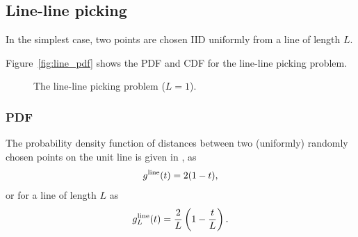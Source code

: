 \subsection{Line-line picking}
\label{sec:line_line}

In the simplest case, two points are chosen IID uniformly from a line
of length $L$. 

Figure~\ref{fig:line_pdf} shows the PDF and CDF for the line-line
picking problem.

\begin{figure}[tbp]
  \begin{center}
    \caption{The line-line picking problem ($L=1$).}
  \end{center}
\vspace{-4mm}
\end{figure}

\subsubsection{PDF}

The probability density function of distances between two (uniformly)
randomly chosen points on the unit line is given in
\cite{weisstein:_line_line_picking,b.ghosh51:_random_rect}, as
\begin{equation}
  \label{eq:line_line}
  g^{\rm line}(t) = 2(1-t),
\end{equation}
or for a line of length $L$ as
\begin{equation}
  \label{eq:line_lineL}
  g^{\rm line}_L(t) = \frac{2}{L} \left( 1-\frac{t}{L} \right).
\end{equation}

